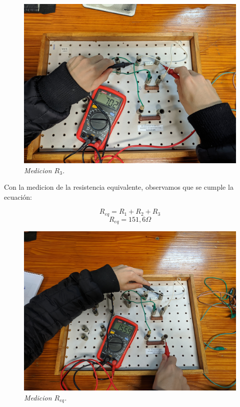 \documentclass[12pt]{report}
\begin{document}
\begin{figure}[h]
\begin{minipage}[h]{0.3\textwidth}
    \includegraphics[width=1\textwidth]{./pictures/SERIE_R3.jpg}
    \textit{Medicion $R_3$.}
  \end{minipage}
\end{figure}

Con la medicion de la resistencia equivalente, observamos que se cumple la ecuación:

\noindent
\begin{figure}[h]
  \centering
  \begin{minipage}[h]{0.4\textwidth}
    \centering
    \vspace{-2em}
    $$R_{eq}=R_1+R_2+R_3$$
    $$R_{eq} = 151,\!6\Omega$$
  \end{minipage}\hskip 5mm
  \begin{minipage}[h]{0.4\textwidth}
    \centering
    \includegraphics[width=1\textwidth]{./pictures/SERIE_Req.jpg}
    \textit{Medicion $R_{eq}$.}
  \end{minipage}
\end{figure}
\end{document}
